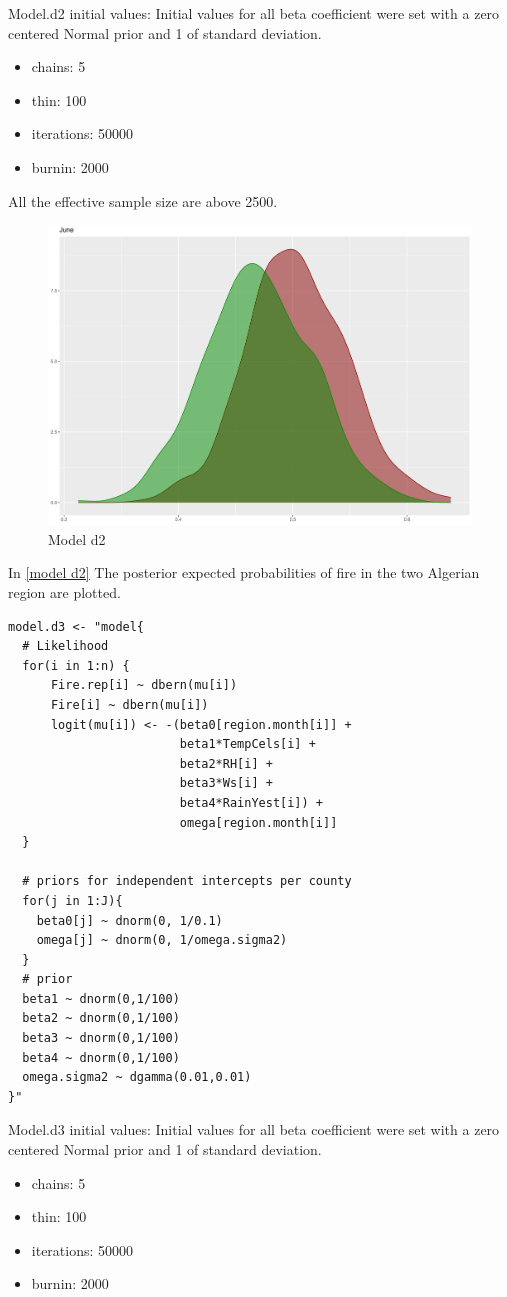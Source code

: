 \documentclass[12pt,a4paper]{article}
\begin{document}
\begin{enumerate}[(a)]
Model.d2 initial values: 
Initial values for all beta coefficient were set with a zero centered Normal prior and 1 of standard deviation.
\begin{itemize}
\item chains: 5
\item thin: 100
\item iterations: 50000
\item burnin: 2000
\end{itemize}

All the effective sample size are above 2500. 

\begin{figure}[h]
    \centering
    \includegraphics[width=0.6\linewidth]{figures/Rplot10.pdf}
    \caption{Model d2}
    \label{model d2}
\end{figure}

In \autoref{model d2} The posterior expected probabilities of fire in the two Algerian region are plotted.


\begin{verbatim}
model.d3 <- "model{
  # Likelihood
  for(i in 1:n) {
      Fire.rep[i] ~ dbern(mu[i])
      Fire[i] ~ dbern(mu[i])
      logit(mu[i]) <- -(beta0[region.month[i]] + 
                        beta1*TempCels[i] + 
                        beta2*RH[i] + 
                        beta3*Ws[i] + 
                        beta4*RainYest[i]) +
                        omega[region.month[i]]
  }
  
  # priors for independent intercepts per county
  for(j in 1:J){
    beta0[j] ~ dnorm(0, 1/0.1)
    omega[j] ~ dnorm(0, 1/omega.sigma2)
  }
  # prior
  beta1 ~ dnorm(0,1/100)
  beta2 ~ dnorm(0,1/100)
  beta3 ~ dnorm(0,1/100)
  beta4 ~ dnorm(0,1/100)
  omega.sigma2 ~ dgamma(0.01,0.01)
}"
\end{verbatim}

Model.d3 initial values: 
Initial values for all beta coefficient were set with a zero centered Normal prior and 1 of standard deviation.
\begin{itemize}
\item chains: 5
\item thin: 100
\item iterations: 50000
\item burnin: 2000
\end{itemize}



\end{enumerate}
\end{document}
